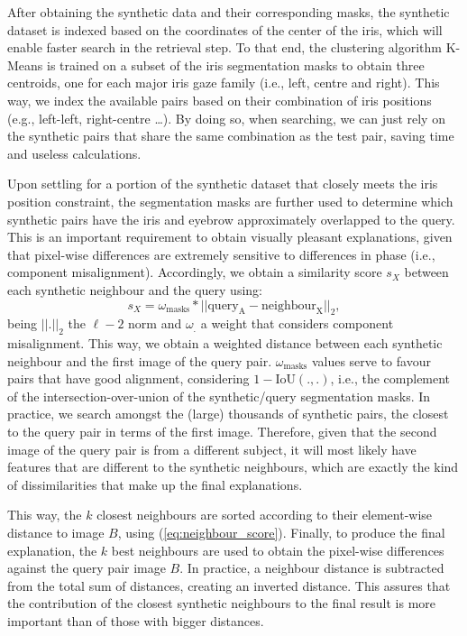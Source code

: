 \documentclass[final]{cvpr}
\begin{document}
After obtaining the synthetic data and their corresponding masks, the synthetic dataset is indexed based on the coordinates of the center of the iris, which will enable faster search in the retrieval step. To that end, the clustering algorithm K-Means is trained on a subset of the iris segmentation masks to obtain three centroids, one for each major iris gaze family (i.e., left, centre and right). This way, we index the available pairs based on their combination of iris positions (e.g., left-left, right-centre \ldots). By doing so, when searching, we can just rely on the synthetic pairs that share the same combination as the test pair, saving time and useless calculations. 

Upon settling for a portion of the synthetic dataset that closely meets the iris position constraint, the segmentation masks are further used to determine which synthetic pairs have the iris and eyebrow approximately overlapped to the query. This is an important requirement to obtain visually pleasant explanations, given that pixel-wise differences are extremely sensitive to differences in phase (i.e., component misalignment). Accordingly, we obtain a similarity score $s_X$ between each synthetic neighbour and the query using:
\begin{equation}
    s_X = \omega_{\text{masks}} * ||\text{query}_{\text{A}} - \text{neighbour}_{\text{X}}||_2,
\label{eq:neighbour_score}
\end{equation}
being $||.||_2$ the $\ell-2$ norm and $\omega_.$ a weight that considers component misalignment. This way, we obtain a weighted distance between each synthetic neighbour and the first image of the query pair. $\omega_{\text{masks}}$ values serve to favour pairs that have good alignment, considering $1 - \text{IoU}(.,.)$, i.e., the complement of the intersection-over-union of the synthetic/query segmentation masks. In practice, we search amongst the (large) thousands of synthetic pairs, the closest to the query pair in terms of the first image. Therefore, given that the second image of the query pair is from a different subject, it will most likely have features that are different to the synthetic neighbours, which are exactly the kind of dissimilarities that make up the final explanations.

This way, the $k$ closest neighbours are sorted according to their element-wise distance to image $B$, using  (\ref{eq:neighbour_score}). Finally, to produce the final explanation, the $k$ best neighbours are used to obtain the pixel-wise differences against the query pair image $B$. In practice, a neighbour distance is subtracted from the total sum of distances, creating an inverted distance. This assures that the contribution of the closest synthetic neighbours to the final result is more important than of those with bigger distances. 
\end{document}
